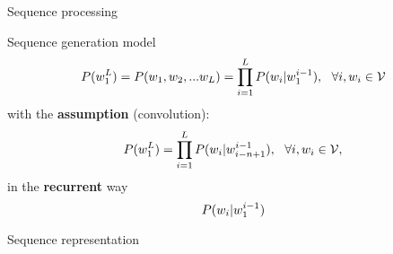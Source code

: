\newcommand{\cga}{{\color{red!70!black} A}}
\newcommand{\cgc}{{\color{blue!70!black} C}}
\newcommand{\cgg}{{\color{yellow!70!black} G}}
\newcommand{\cgt}{{\color{green!70!black} T}}


\begin{frame}{Sequence processing}
  \begin{block}{Sequence generation model}
    $$
    P({{w}_{1}^{L}}) = P({w}_1, {w}_2, ... {w}_L) = \prod_{i=1}^L P({w}_i | {{w}_{1}^{i-1}}),\ \ \forall i , {w}_i \in {\mathcal{V}}
    $$
    with the \textbf{\ngram assumption} (convolution):
    $$
    P({{w}_{1}^{L}}) = \prod_{i=1}^L P({w}_i | {{w}_{i-n+1}^{i-1}}),\ \ \forall i , {w}_i \in {\mathcal{V}},
    $$
    in the \textbf{recurrent} way 
    $$ P({w}_i | {{w}_{1}^{i-1}})$$
  \end{block}
  \begin{block}{Sequence representation}
    \begin{center}
    \end{center}
  \end{block}
\end{frame}

